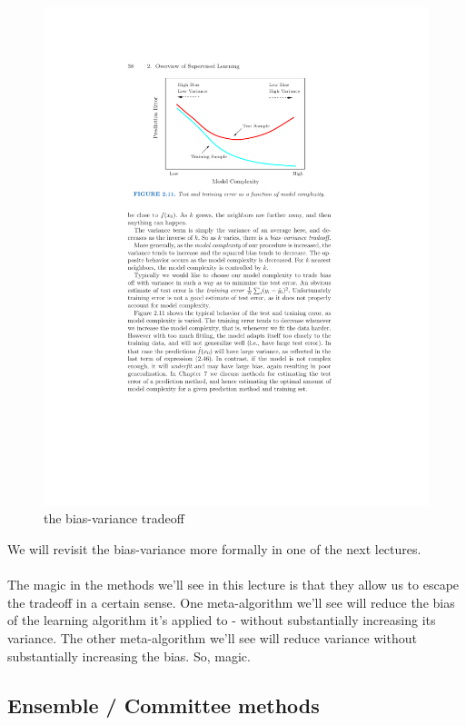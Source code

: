 \begin{figure}[H]
  \centering
  \includegraphics[width=4.5in]{ESL_bias_variance.pdf}  
  \caption{the bias-variance tradeoff}
\end{figure}

We will revisit the bias-variance more formally in one of the next lectures.
\\~\\
The magic in the methods we'll see in this lecture is that they allow us to
escape the tradeoff in a certain sense. One meta-algorithm we'll see will
reduce the bias of the learning algorithm it's applied to - without
substantially increasing its variance. The other meta-algorithm we'll see will
reduce variance without substantially increasing the bias. So, magic.

\subsection{Ensemble / Committee methods}

